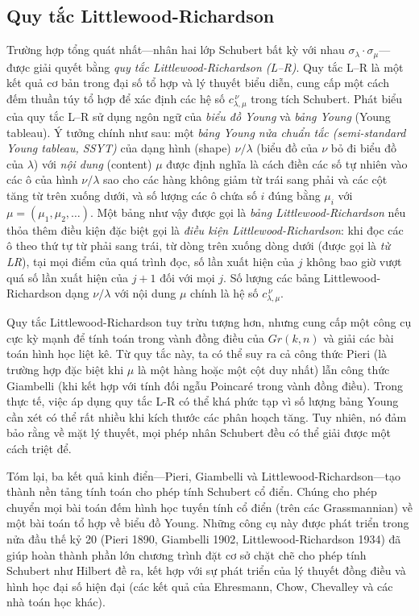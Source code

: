 \subsection{Quy tắc Littlewood-Richardson}
Trường hợp tổng quát nhất---nhân hai lớp Schubert bất kỳ với nhau $\sigma_{\lambda} \cdot \sigma_{\mu}$---được giải quyết bằng \textit{quy tắc Littlewood-Richardson (L--R)}. Quy tắc L--R là một kết quả cơ bản trong đại số tổ hợp và lý thuyết biểu diễn, cung cấp một cách đếm thuần túy tổ hợp để xác định các hệ số $c_{\lambda,\mu}^{\,\nu}$ trong tích Schubert. Phát biểu của quy tắc L--R sử dụng ngôn ngữ của \textit{biểu đồ Young} và \textit{bảng Young} (Young tableau). Ý tưởng chính như sau: một \textit{bảng Young nửa chuẩn tắc (semi-standard Young tableau, SSYT)} của dạng hình (shape) $\nu/\lambda$ (biểu đồ của $\nu$ bỏ đi biểu đồ của $\lambda$) với \textit{nội dung} (content) $\mu$ được định nghĩa là cách điền các số tự nhiên vào các ô của hình $\nu/\lambda$ sao cho các hàng không giảm từ trái sang phải và các cột tăng từ trên xuống dưới, và số lượng các ô chứa số $i$ đúng bằng $\mu_i$ với $\mu = (\mu_1,\mu_2,\dots)$. Một bảng như vậy được gọi là \textit{bảng Littlewood-Richardson} nếu thỏa thêm điều kiện đặc biệt gọi là \textit{điều kiện Littlewood-Richardson}: khi đọc các ô theo thứ tự từ phải sang trái, từ dòng trên xuống dòng dưới (được gọi là \textit{từ LR}), tại mọi điểm của quá trình đọc, số lần xuất hiện của $j$ không bao giờ vượt quá số lần xuất hiện của $j+1$ đối với mọi $j$. Số lượng các bảng Littlewood-Richardson dạng $\nu/\lambda$ với nội dung $\mu$ chính là hệ số $c_{\lambda,\mu}^{\,\nu}$.

Quy tắc Littlewood-Richardson tuy trừu tượng hơn, nhưng cung cấp một công cụ cực kỳ mạnh để tính toán trong vành đồng điều của $Gr(k,n)$ và giải các bài toán hình học liệt kê. Từ quy tắc này, ta có thể suy ra cả công thức Pieri (là trường hợp đặc biệt khi $\mu$ là một hàng hoặc một cột duy nhất) lẫn công thức Giambelli (khi kết hợp với tính đối ngẫu Poincaré trong vành đồng điều). Trong thực tế, việc áp dụng quy tắc L-R có thể khá phức tạp vì số lượng bảng Young cần xét có thể rất nhiều khi kích thước các phân hoạch tăng. Tuy nhiên, nó đảm bảo rằng về mặt lý thuyết, mọi phép nhân Schubert đều có thể giải được một cách triệt để.

Tóm lại, ba kết quả kinh điển---Pieri, Giambelli và Littlewood-Richardson---tạo thành nền tảng tính toán cho phép tính Schubert cổ điển. Chúng cho phép chuyển mọi bài toán đếm hình học tuyến tính cổ điển (trên các Grassmannian) về một bài toán tổ hợp về biểu đồ Young. Những công cụ này được phát triển trong nửa đầu thế kỷ 20 (Pieri 1890, Giambelli 1902, Littlewood-Richardson 1934) đã giúp hoàn thành phần lớn chương trình đặt cơ sở chặt chẽ cho phép tính Schubert như Hilbert đề ra, kết hợp với sự phát triển của lý thuyết đồng điều và hình học đại số hiện đại (các kết quả của Ehresmann, Chow, Chevalley và các nhà toán học khác).
